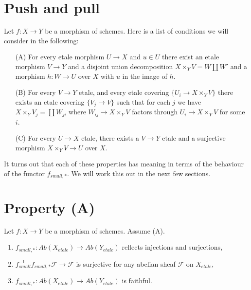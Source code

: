 \section{Push and pull}
\label{section-monomorphisms}

\noindent
Let $f : X \to Y$ be a morphism of schemes.
Here is a list of conditions we will consider in the following:
\begin{enumerate}
\item[(A)] For every etale morphism $U \to X$ and $u \in U$ there exist
an etale morphism $V \to Y$ and a disjoint union decomposition
$X \times_Y V = W \amalg W'$ and a morphism $h : W \to U$ over $X$
with $u$ in the image of $h$.
\item[(B)] For every $V \to Y$ etale, and every etale covering
$\{U_i \to X \times_Y V\}$ there exists an etale covering
$\{V_j \to V\}$ such that for each $j$ we have
$X \times_Y V_j = \coprod W_{ji}$ where $W_{ij} \to X \times_Y V$
factors through $U_i \to X \times_Y V$ for some $i$.
\item[(C)] For every $U \to X$ etale, there exists a $V \to Y$ etale
and a surjective morphism $X \times_Y V \to U$ over $X$.
\end{enumerate}
It turns out that each of these properties has meaning in terms of
the behaviour of the functor $f_{small, *}$. We will work this
out in the next few sections.



\section{Property (A)}
\label{section-A}

\begin{lemma}
\label{lemma-property-A-implies}
Let $f : X \to Y$ be a morphism of schemes.
Assume (A).
\begin{enumerate}
\item $f_{small, *}: \textit{Ab}(X_{etale}) \to \textit{Ab}(Y_{etale})$
reflects injections and surjections,
\item $f_{small}^{-1}f_{small, *}\mathcal{F} \to \mathcal{F}$
is surjective for any abelian sheaf $\mathcal{F}$ on $X_{etale}$,
\item $f_{small, *}: \textit{Ab}(X_{etale}) \to \textit{Ab}(Y_{etale})$
is faithful.
\end{enumerate}
\end{lemma}

